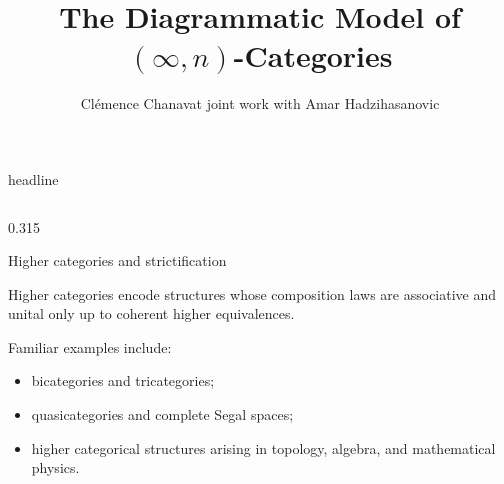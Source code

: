 \documentclass[final]{beamer}
\title{The Diagrammatic Model of \texorpdfstring{$(\infty,n)$}{(infinity,n)}-Categories}
\author{
  Clémence Chanavat
  \qquad
  \textnormal{joint work with Amar Hadzihasanovic}
}
\institute{
  Tallinn University of Technology
  \qquad
  \texttt{\placeholder{email address}}
}
\begin{document}
\begin{frame}[fragile, t]


\begin{beamercolorbox}[
  wd=\paperwidth,
  sep=2.2ex,
  center
]{headline}

  {\inserttitle\par}

  \vspace{0.6ex}

  {\insertauthor\par}

  \vspace{0.3ex}

  {\insertinstitute\par}

\end{beamercolorbox}

\vspace{1.5ex}


\begin{columns}[t,totalwidth=\textwidth]


\begin{column}{0.315\textwidth}

\begin{block}{Higher categories and strictification}

Higher categories encode structures whose composition laws are associative
and unital only up to coherent higher equivalences.

\medskip

Familiar examples include:

\begin{itemize}
  \item bicategories and tricategories;
  \item quasicategories and complete Segal spaces;
  \item higher categorical structures arising in topology,
        algebra, and mathematical physics.
\end{itemize}


\end{block}
\end{column}
\end{columns}
\end{frame}
\end{document}
